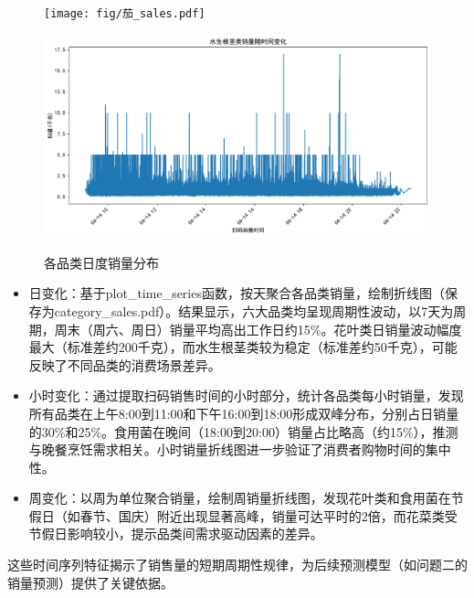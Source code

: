 \documentclass{cumcmthesis} %
\begin{document}
\begin{figure}[H]
    \begin{minipage}[c]{0.45\textwidth}
        \centering
        \texttt{[image: fig/茄\_sales.pdf]}
        \label{fig:sample-figure-e}
    \end{minipage}
    \hfill
    \begin{minipage}[c]{0.45\textwidth}
        \centering
        \includegraphics[width=\textwidth]{fig/水生根茎_sales.pdf}
        \label{fig:sample-figure-f}
    \end{minipage}
    
    \caption{各品类日度销量分布}
    \label{fig:sample-figure}
\end{figure}

\begin{itemize}
    \item 日变化：基于plot\_time\_series函数，按天聚合各品类销量，绘制折线图（保存为category\_sales.pdf）。结果显示，六大品类均呈现周期性波动，以7天为周期，周末（周六、周日）销量平均高出工作日约15\%。花叶类日销量波动幅度最大（标准差约200千克），而水生根茎类较为稳定（标准差约50千克），可能反映了不同品类的消费场景差异。
    \item 小时变化：通过提取扫码销售时间的小时部分，统计各品类每小时销量，发现所有品类在上午8:00到11:00和下午16:00到18:00形成双峰分布，分别占日销量的30\%和25\%。食用菌在晚间（18:00到20:00）销量占比略高（约15\%），推测与晚餐烹饪需求相关。小时销量折线图进一步验证了消费者购物时间的集中性。
    \item 周变化：以周为单位聚合销量，绘制周销量折线图，发现花叶类和食用菌在节假日（如春节、国庆）附近出现显著高峰，销量可达平时的2倍，而花菜类受节假日影响较小，提示品类间需求驱动因素的差异。
\end{itemize}
这些时间序列特征揭示了销售量的短期周期性规律，为后续预测模型（如问题二的销量预测）提供了关键依据。
\end{document}
